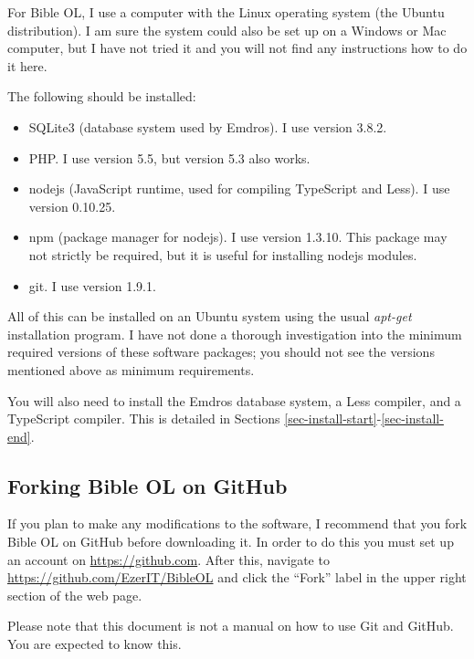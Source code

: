 \documentclass[11pt,oneside,a4paper]{memoir}
\begin{document}
For Bible OL, I use a computer with the Linux operating system (the
Ubuntu distribution). I am sure the system could also be set up on a
Windows or Mac computer, but I have not tried it and you will not find any
instructions how to do it here.

The following should be installed:

\begin{itemize}
\item SQLite3 (database system used by Emdros). I use version 3.8.2.
\item PHP. I use version 5.5, but version 5.3 also works.
\item nodejs (JavaScript runtime, used for compiling TypeScript and Less). I use version
  0.10.25.
\item npm (package manager for nodejs). I use version 1.3.10.
  This package may not strictly be required, but it is useful for installing nodejs modules.
\item git. I use version 1.9.1.
\end{itemize}


All of this can be installed on an Ubuntu system using the usual \emph{apt-get} installation
program. I have not done a thorough investigation into the minimum required versions of these
software packages; you should not see the versions mentioned above as minimum requirements.

You will also need to install the Emdros database system, a Less compiler, and a TypeScript
compiler. This is detailed in Sections \ref{sec-install-start}-\ref{sec-install-end}.

\subsection{Forking Bible OL on GitHub}\label{sec-fork-github}

If you plan to make any modifications to the software, I recommend that you fork Bible OL on GitHub
before downloading it. In order to do this you must set up an account on \url{https://github.com}.
After this, navigate to \url{https://github.com/EzerIT/BibleOL} and click the ``Fork'' label in the
upper right section of the web page.

Please note that this document is not a manual on how to use Git and GitHub. You are expected to
know this.
\end{document}
